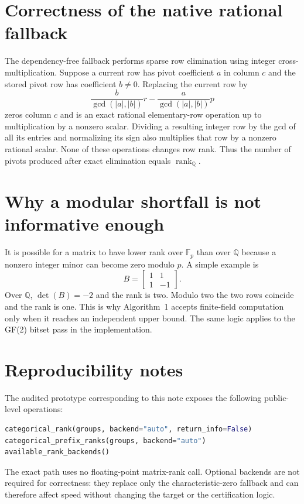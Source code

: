 \documentclass[11pt]{article}
\theoremstyle{definition}
\newcommand{\Q}{\mathbb{Q}}
\newcommand{\F}{\mathbb{F}}
\newcommand{\rank}{\operatorname{rank}}
\newcommand{\1}{\mathbf{1}}
\begin{document}
\section{Correctness of the native rational fallback}

The dependency-free fallback performs sparse row elimination using integer cross-multiplication. Suppose a current row has pivot coefficient $a$ in column $c$ and the stored pivot row has coefficient $b\neq0$. Replacing the current row by
\begin{equation}
  \frac{b}{\gcd(|a|,|b|)}r
  -\frac{a}{\gcd(|a|,|b|)}p
\end{equation}
zeros column $c$ and is an exact rational elementary-row operation up to multiplication by a nonzero scalar. Dividing a resulting integer row by the gcd of all its entries and normalizing its sign also multiplies that row by a nonzero rational scalar. None of these operations changes row rank. Thus the number of pivots produced after exact elimination equals $\rank_{\Q}$.

\section{Why a modular shortfall is not informative enough}

It is possible for a matrix to have lower rank over $\F_p$ than over $\Q$ because a nonzero integer minor can become zero modulo $p$. A simple example is
\begin{equation*}
  B=\begin{bmatrix}1&1\\1&-1\end{bmatrix}.
\end{equation*}
Over $\Q$, $\det(B)=-2$ and the rank is two. Modulo two the two rows coincide and the rank is one. This is why Algorithm~1 accepts finite-field computation only when it reaches an independent upper bound. The same logic applies to the GF(2) bitset pass in the implementation.

\section{Reproducibility notes}

The audited prototype corresponding to this note exposes the following public-level operations:
\begin{lstlisting}[language=Python]
categorical_rank(groups, backend="auto", return_info=False)
categorical_prefix_ranks(groups, backend="auto")
available_rank_backends()
\end{lstlisting}
The exact path uses no floating-point matrix-rank call. Optional backends are not required for correctness: they replace only the characteristic-zero fallback and can therefore affect speed without changing the target or the certification logic.
\end{document}
